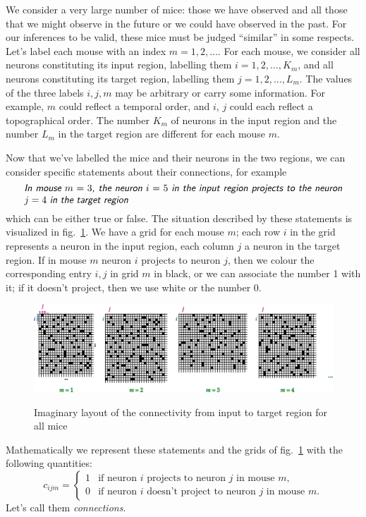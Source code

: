 \documentclass[\ifafour a4paper,12pt,\else a5paper,10pt,\fi%
onecolumn,oneside,article,%
british%
]{memoir}
\theoremstyle{remark}
\theoremstyle{innote}
\renewcommand*{\|}[1][]{\nonscript\,#1\vert\nonscript\;\mathopen{}}
\newcommand*{\fig}{fig.}%
\newcommand*{\yc}{c}
\newcommand*{\statm}[1]{\textsl{\textsf{#1}}}
\begin{document}
We consider a very large number of mice: those we have observed and all
those that we might observe in the future or we could have observed in the
past. For our inferences to be valid, these mice must be judged
\enquote{similar} in some respects. Let's label each mouse with an index
$m=1,2,\dotsc$. For each mouse, we consider all neurons constituting its
input region, labelling them $i=1,2,\dotsc, K_{m}$, and all neurons
constituting its target region, labelling them $j=1,2,\dotsc, L_{m}$. The
values of the three labels $i,j,m$ may be arbitrary or carry some
information. For example, $m$ could reflect a temporal order, and $i$, $j$
could each reflect a topographical order. The number $K_{m}$ of neurons in
the input region and the number $L_{m}$ in the target region are different
for each mouse $m$.

Now that we've labelled the mice and their neurons in the two regions, we
can consider specific statements about their connections, for example
\[\parbox{0.95\linewidth}{\statm{In mouse $m=3$, the neuron $i=5$ in the input
      region projects to the neuron $j=4$ in the target region}}\]
which can be either true or false. The situation described by these
statements is visualized in \fig~\ref{fig:cmij}. We have a grid for each
mouse $m$; each row $i$ in the grid represents a neuron in the input region,
each column $j$ a neuron in the target region. If in mouse $m$ neuron $i$
projects to neuron $j$, then we colour the corresponding entry $i,j$ in
grid $m$ in black, or we can associate the number 1 with it; if it doesn't
project, then we use white or the number 0.
\begin{figure}[t!]%
 \centering\includegraphics[width=\linewidth]{bente_notes_drawings.png}\\
 \caption{Imaginary layout of the connectivity from input to target region
   for all mice}\label{fig:cmij}
\end{figure}%

Mathematically we represent these statements and the grids of
\fig~\ref{fig:cmij} with the following quantities:
\begin{equation}
  \label{eq:quantity_connection}
  \yc_{ijm} =
  \begin{cases}
    1&\text{if neuron $i$ projects to neuron $j$ in mouse $m$},\\
    0&\text{if neuron $i$ doesn't project to neuron $j$ in mouse $m$}.
  \end{cases}
\end{equation}
Let's call them \emph{connections}.
\end{document}
